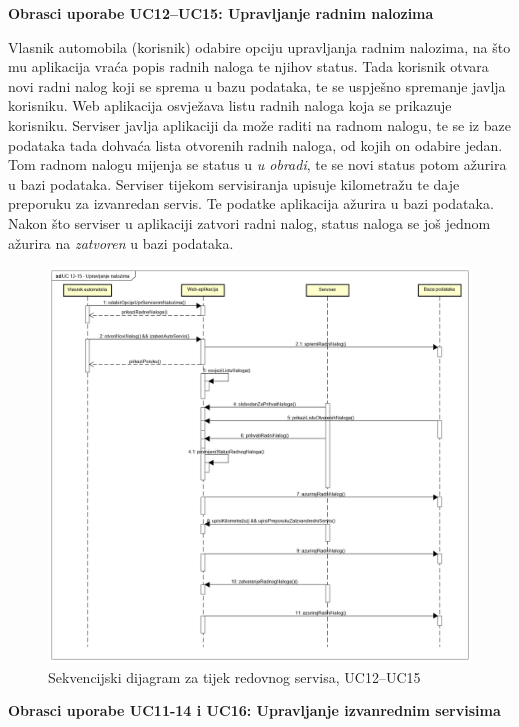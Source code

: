 \textbf{Obrasci uporabe UC12--UC15: Upravljanje radnim nalozima}
	
\noindent Vlasnik automobila (korisnik) odabire opciju upravljanja radnim nalozima, na što mu aplikacija vraća popis radnih naloga te njihov status. Tada korisnik otvara novi radni nalog koji se sprema u bazu podataka, te se uspješno spremanje javlja korisniku. Web aplikacija osvježava listu radnih naloga koja se prikazuje korisniku. Serviser javlja aplikaciji da može raditi na radnom nalogu, te se iz baze podataka tada dohvaća lista otvorenih radnih naloga, od kojih on odabire jedan. Tom radnom nalogu mijenja se status u \textit{u obradi}, te se novi status potom ažurira u bazi podataka. Serviser tijekom servisiranja upisuje kilometražu te daje preporuku za izvanredan servis. Te podatke aplikacija ažurira u bazi podataka. Nakon što serviser u aplikaciji zatvori radni nalog, status naloga se još jednom ažurira na \textit{zatvoren} u bazi podataka.
	
	\begin{figure}[H]
		\includegraphics[width=\linewidth]{dijagrami/seq-dia1.png}
		\centering
		\caption{Sekvencijski dijagram za tijek redovnog servisa, UC12--UC15}
		\label{fig:sequence-diagram1}
	\end{figure}


\textbf{Obrasci uporabe UC11-14 i UC16: Upravljanje izvanrednim servisima}

